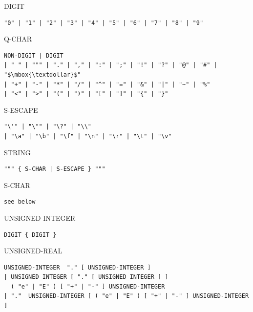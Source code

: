 \begin{lexicalunit}{DIGIT}
\begin{lstlisting}
"0" | "1" | "2" | "3" | "4" | "5" | "6" | "7" | "8" | "9"
\end{lstlisting}
\end{lexicalunit}

\begin{lexicalunit}{Q-CHAR}
\begin{lstlisting}
NON-DIGIT | DIGIT
| " " | """ | "." | "," | ":" | ";" | "!" | "?" | "@" | "#" | "$\mbox{\textdollar}$"
| "+" | "-" | "*" | "/" | "^" | "=" | "&" | "|" | "~" | "%"
| "<" | ">" | "(" | ")" | "[" | "]" | "{" | "}"
\end{lstlisting}
\end{lexicalunit}

\begin{lexicalunit}{S-ESCAPE}
\begin{lstlisting}
"\'" | "\"" | "\?" | "\\"
| "\a" | "\b" | "\f" | "\n" | "\r" | "\t" | "\v"
\end{lstlisting}
\end{lexicalunit}

\begin{lexicalunit}{STRING}
\begin{lstlisting}
""" { S-CHAR | S-ESCAPE } """
\end{lstlisting}
\end{lexicalunit}

\begin{lexicalunit}{S-CHAR}
\begin{lstlisting}
see below
\end{lstlisting}
\end{lexicalunit}

\begin{lexicalunit}{UNSIGNED-INTEGER}
\begin{lstlisting}
DIGIT { DIGIT }
\end{lstlisting}
\end{lexicalunit}

\begin{lexicalunit}{UNSIGNED-REAL}
\begin{lstlisting}
UNSIGNED-INTEGER  "." [ UNSIGNED-INTEGER ]
| UNSIGNED_INTEGER [ "." [ UNSIGNED_INTEGER ] ]
  ( "e" | "E" ) [ "+" | "-" ] UNSIGNED-INTEGER
| "."  UNSIGNED-INTEGER [ ( "e" | "E" ) [ "+" | "-" ] UNSIGNED-INTEGER ]
\end{lstlisting}
\end{lexicalunit}


